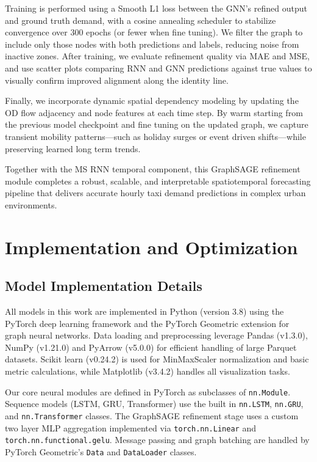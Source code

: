 \documentclass{article}
\begin{document}
Training is performed using a Smooth L1 loss between the GNN’s refined output and ground truth demand, with a cosine annealing scheduler to stabilize convergence over 300 epochs (or fewer when fine tuning). We filter the graph to include only those nodes with both predictions and labels, reducing noise from inactive zones. After training, we evaluate refinement quality via MAE and MSE, and use scatter plots comparing RNN and GNN predictions against true values to visually confirm improved alignment along the identity line.

Finally, we incorporate dynamic spatial dependency modeling by updating the OD flow adjacency and node features at each time step. By warm starting from the previous model checkpoint and fine tuning on the updated graph, we capture transient mobility patterns—such as holiday surges or event driven shifts—while preserving learned long term trends.  

Together with the MS RNN temporal component, this GraphSAGE refinement module completes a robust, scalable, and interpretable spatiotemporal forecasting pipeline that delivers accurate hourly taxi demand predictions in complex urban environments.  

\section{Implementation and Optimization}
\subsection{Model Implementation Details}

All models in this work are implemented in Python (version 3.8) using the PyTorch deep learning framework and the PyTorch Geometric extension for graph neural networks. Data loading and preprocessing leverage Pandas (v1.3.0), NumPy (v1.21.0) and PyArrow (v5.0.0) for efficient handling of large Parquet datasets. Scikit learn (v0.24.2) is used for MinMaxScaler normalization and basic metric calculations, while Matplotlib (v3.4.2) handles all visualization tasks.

Our core neural modules are defined in PyTorch as subclasses of \texttt{nn.Module}. Sequence models (LSTM, GRU, Transformer) use the built in \texttt{nn.LSTM}, \texttt{nn.GRU}, and \texttt{nn.Transformer} classes. The GraphSAGE refinement stage uses a custom two layer MLP aggregation implemented via \texttt{torch.nn.Linear} and \texttt{torch.nn.functional.gelu}. Message passing and graph batching are handled by PyTorch Geometric’s \texttt{Data} and \texttt{DataLoader} classes.
\end{document}
